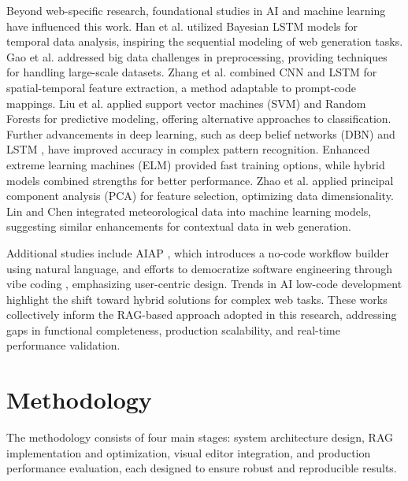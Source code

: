 \documentclass[10pt, conference, letterpaper]{IEEEtran}
\begin{document}
Beyond web-specific research, foundational studies in AI and machine learning have influenced this work. Han et al. \cite{han2018bayesian} utilized Bayesian LSTM models for temporal data analysis, inspiring the sequential modeling of web generation tasks. Gao et al. \cite{gao2016big} addressed big data challenges in preprocessing, providing techniques for handling large-scale datasets. Zhang et al. \cite{qin2019novel} combined CNN and LSTM for spatial-temporal feature extraction, a method adaptable to prompt-code mappings. Liu et al. \cite{ip2010least} applied support vector machines (SVM) and Random Forests for predictive modeling, offering alternative approaches to classification. Further advancements in deep learning, such as deep belief networks (DBN) \cite{cheng2020minimization} and LSTM \cite{kumar2018impact}, have improved accuracy in complex pattern recognition. Enhanced extreme learning machines (ELM) \cite{gao2018enhanced} provided fast training options, while hybrid models \cite{park2019hybrid} combined strengths for better performance. Zhao et al. \cite{zhao2019improving} applied principal component analysis (PCA) for feature selection, optimizing data dimensionality. Lin and Chen \cite{lin2019incorporating} integrated meteorological data into machine learning models, suggesting similar enhancements for contextual data in web generation.

Additional studies include AIAP \cite{aiap2025}, which introduces a no-code workflow builder using natural language, and efforts to democratize software engineering through vibe coding \cite{democratizing2025}, emphasizing user-centric design. Trends in AI low-code development \cite{bubbleiodeveloper2025ai} highlight the shift toward hybrid solutions for complex web tasks. These works collectively inform the RAG-based approach adopted in this research, addressing gaps in functional completeness, production scalability, and real-time performance validation.

\section{Methodology}
The methodology consists of four main stages: system architecture design, RAG implementation and optimization, visual editor integration, and production performance evaluation, each designed to ensure robust and reproducible results.
\end{document}
